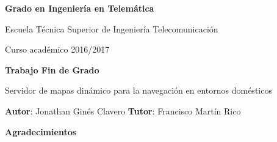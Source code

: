 \documentclass[twoside,a4paper,12pt,openany]{book}
\begin{document}
\thispagestyle{empty}

\baselineskip

\vspace{2cm}

\begin{figure}[htb]
  \centerline{}
\end{figure}

\begin{center}
  {\Large {\bf Grado en Ingeniería en Telemática}}
  \vspace{5mm}
 
  {\large {Escuela Técnica Superior de Ingeniería Telecomunicación}}
  \vspace{5mm}

  {\large {Curso académico 2016/2017}}

  \vspace{1cm}

  {\large {\bf Trabajo Fin de Grado}}

  \vspace{2cm}

  {\Large {Servidor de mapas dinámico para la navegación en entornos domésticos\\[1cm] }}

  \vspace{5cm}
  {\bf Autor}: Jonathan Ginés Clavero
  {\bf Tutor}: Francisco Martín Rico 
\end{center}

\clearpage
\newpage{\pagestyle{empty}\cleardoublepage}
\thispagestyle{empty}

\vspace{5cm}

\clearpage
\newpage{\pagestyle{empty}\cleardoublepage}
\thispagestyle{empty}

\vspace{5cm}
\textbf{\huge{Agradecimientos}}\\
\end{document}

